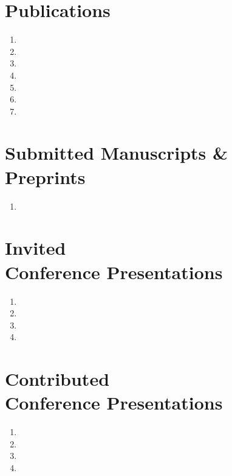 \documentclass[margin,centered]{res}
\begin{document}
\begin{resume}
\section{\sc Publications}
\begin{enumerate}[leftmargin=*]
\item {}
\item {}
\item {}
\item {}
\item {}
\item {}
\item {}
\end{enumerate}

\section{\sc Submitted Manuscripts \& Preprints}

\begin{enumerate}[leftmargin=*]
\item {}
\end{enumerate}



\section{\sc Invited \\ Conference Presentations}
\begin{enumerate}[leftmargin=*]
\item {}
\item {}
\item {}
\item {}
\end{enumerate}

\section{\sc Contributed \\ Conference Presentations}
\begin{enumerate}[leftmargin=*]
\item {}
\item {}
\item {}
\item {}
\end{enumerate}





\end{resume}
\end{document}
